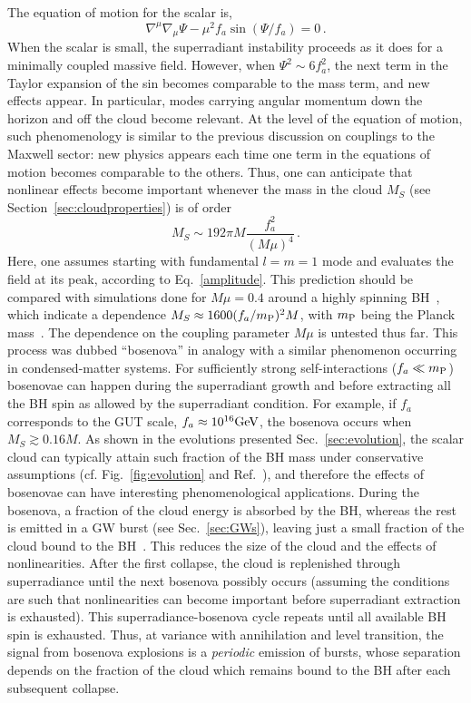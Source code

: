 \documentclass[11pt]{article}
\newcommand{\be}{\begin{equation}}
\newcommand{\ee}{\end{equation}}
\numberwithin{equation}{section} %
\begin{document}
The equation of motion for the scalar is,
%
\be
\nabla^{\mu}\nabla_{\mu}\Psi - \mu^{2}f_a\sin\left(\Psi/f_a\right)=0\,.
\ee
%
When the scalar is small, the superradiant instability proceeds as it does for a minimally coupled massive field.
However, when $\Psi^2\sim 6 f_a^2$, the next term in the Taylor expansion of the sin becomes comparable to the mass 
term, and new effects appear. In particular, modes carrying angular momentum down the horizon and off the cloud become 
relevant.
At the level of the equation of motion, such phenomenology is similar to the previous discussion on couplings to the 
Maxwell sector:
new physics appears each time one term in the equations of motion becomes comparable to the others.
Thus, one can anticipate that nonlinear effects become important whenever the mass in the cloud $M_S$ (see 
Section~\ref{sec:cloudproperties}) is of order
%
\be\label{eq:crit_bosenova}
M_S\sim 192\pi M\frac{f_a^2}{(M\mu)^4}\,.
\ee
%
Here, one assumes starting with fundamental $l=m=1$ mode and evaluates the field at its peak, according to 
Eq.~\eqref{amplitude}. This prediction should be compared with simulations done for $M\mu=0.4$ around a highly spinning 
BH~\cite{Kodama:2011zc,Yoshino:2012kn}, which indicate a dependence $M_S\approx 1600(f_a/m_{\rm P})^2 M$, with $m_{\rm 
P}$ being the Planck mass~\cite{Yoshino:2012kn,Kodama:2011zc,Yoshino:2014wwa}. The dependence on the coupling parameter 
$M\mu$ is untested thus far. This process was dubbed ``bosenova'' in analogy with a similar phenomenon occurring in 
condensed-matter systems. For sufficiently strong self-interactions ($f_a\ll m_{\rm P}$) bosenovae can happen during the 
superradiant growth and before extracting all the BH spin as allowed by the superradiant condition. For example, if 
$f_a$ corresponds to the GUT scale, $f_a\approx 10^{16}{\rm GeV}$, the bosenova occurs when $M_S\gtrsim 0.16 M$. As 
shown in the evolutions presented Sec.~\ref{sec:evolution}, the scalar cloud can typically attain such fraction of the 
BH mass under conservative assumptions (cf. Fig.~\ref{fig:evolution} and Ref.~\cite{Brito:2014wla}), and therefore the 
effects of bosenovae can have interesting phenomenological applications.
%
During the bosenova, a fraction of the cloud energy is absorbed by the BH, whereas the rest is emitted in a GW burst 
(see Sec.~\ref{sec:GWs}), leaving just a small fraction of the cloud bound to the 
BH~\cite{Yoshino:2012kn,Kodama:2011zc,Yoshino:2014wwa,Arvanitaki:2010sy}. 
This reduces the size of the cloud and the effects of nonlinearities. After the first collapse, the cloud is replenished 
through superradiance until the next bosenova possibly occurs (assuming the conditions are such that nonlinearities can 
become important before superradiant extraction is exhausted). This superradiance-bosenova cycle repeats until all 
available BH spin is exhausted. Thus, at variance with annihilation and level transition, the signal from bosenova 
explosions is a \emph{periodic} emission of bursts, whose separation depends on the fraction of the cloud which remains 
bound to the BH after each subsequent collapse. 
\end{document}
